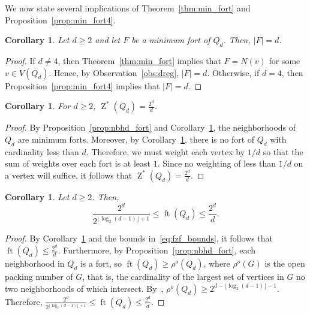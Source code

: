 \documentclass[twoside, 12pt]{article}
\newtheorem{corollary}[theorem]{Corollary}
\theoremstyle{definition}
\newcommand\abs[1]{\left|#1\right|}
\newcommand\floor[1]{\lfloor#1\rfloor}
\DeclareMathOperator{\Z}{Z}
\DeclareMathOperator{\ft}{ft}
\begin{document}
We now state several implications of Theorem~\ref{thm:min_fort} and Proposition~\ref{prop:min_fort4}.
\begin{corollary}\label{cor:min_fort}
Let $d\geq 2$ and let $F$ be a minimum fort of $Q_{d}$.
Then, $\abs{F}=d$.
\end{corollary}
\begin{proof}
If $d\neq 4$,
then Theorem~\ref{thm:min_fort} implies that $F=N(v)$ for some $v\in V(Q_{d})$.
Hence, by Observation~\ref{obs:dreg}, $\abs{F}=d$.
Otherwise, if $d=4$, then Proposition~\ref{prop:min_fort4} implies that $\abs{F}=d$. 
\end{proof}
\begin{corollary}\label{cor:fzf_hypercube}
For $d\geq 2$, $\Z^{*}(Q_{d})=\frac{2^{d}}{d}$.
\end{corollary}
\begin{proof}
By Proposition~\ref{prop:nbhd_fort} and Corollary~\ref{cor:min_fort}, the neighborhoods of $Q_{d}$ are minimum forts.
Moreover, by Corollary~\ref{cor:min_fort}, there is no fort of $Q_{d}$ with cardinality less than $d$.
Therefore, we must weight each vertex by $1/d$ so that the sum of weights over each fort is at least $1$.
Since no weighting of less than $1/d$ on a vertex will suffice, it follows that $\Z^{*}(Q_{d})=\frac{2^{d}}{d}$.
\end{proof}
\begin{corollary}\label{cor:ft_bounds}
Let $d\geq 2$.
Then, 
\[
\frac{2^{d}}{2^{\floor{\log_{2}(d-1)}+1}} \leq \ft(Q_{d}) \leq \frac{2^{d}}{d}. 
\]
\end{corollary}
\begin{proof}
By Corollary~\ref{cor:fzf_hypercube} and the bounds in~\eqref{eq:fzf_bounds}, it follows that $\ft(Q_{d}) \leq \frac{2^{d}}{d}$.
Furthermore, by Proposition~\ref{prop:nbhd_fort}, each neighborhood in $Q_{d}$ is a fort, so $\ft(Q_{d})\geq\rho^{o}(Q_{d})$, where $\rho^{o}(G)$ is the open packing number of $G$, that is, the cardinality of the largest set of vertices in $G$ no two neighborhoods of which intersect. 
By~\cite[Theorem 3.2]{Bresar2024}, $\rho^{o}(Q_{d}) \geq 2^{d-\floor{\log_{2}(d-1)}-1}$.
Therefore, $\frac{2^{d}}{2^{\floor{\log_{2}(d-1)}+1}} \leq \ft(Q_{d}) \leq \frac{2^{d}}{d}$.
\end{proof}
\end{document}
